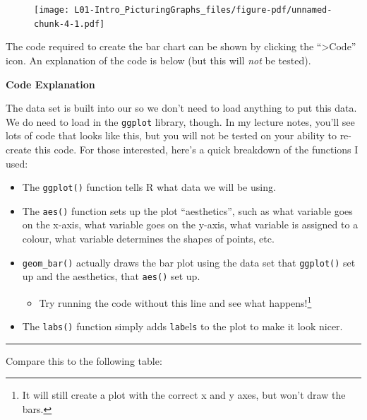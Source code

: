 \documentclass[
  letterpaper,
  DIV=11,
  numbers=noendperiod,
  oneside]{scrreprt}
\newenvironment{Shaded}{\begin{snugshade}}{\end{snugshade}}
\newcommand{\FunctionTok}[1]{\textcolor[rgb]{0.28,0.35,0.67}{#1}}
\newcommand{\NormalTok}[1]{\textcolor[rgb]{0.00,0.23,0.31}{#1}}
\newcommand{\SpecialCharTok}[1]{\textcolor[rgb]{0.37,0.37,0.37}{#1}}
\providecommand{\tightlist}{%
  \setlength{\itemsep}{0pt}\setlength{\parskip}{0pt}}\usepackage{longtable,booktabs,array}
\begin{document}
\begin{figure}[H]

{\centering \texttt{[image: L01-Intro\_PicturingGraphs\_files/figure-pdf/unnamed-chunk-4-1.pdf]}

}

\end{figure}

The code required to create the bar chart can be shown by clicking the
``\textgreater Code'' icon. An explanation of the code is below (but
this will \emph{not} be tested).

\textbf{Code Explanation}

The data set is built into our so we don't need to load anything to put
this data. We do need to load in the \texttt{ggplot} library, though. In
my lecture notes, you'll see lots of code that looks like this, but you
will not be tested on your ability to re-create this code. For those
interested, here's a quick breakdown of the functions I used:

\begin{itemize}
\tightlist
\item
  The \texttt{ggplot()} function tells R what data we will be using.
\item
  The \texttt{aes()} function sets up the plot ``aesthetics'', such as
  what variable goes on the x-axis, what variable goes on the y-axis,
  what variable is assigned to a colour, what variable determines the
  shapes of points, etc.
\item
  \texttt{geom\_bar()} actually draws the bar plot using the data set
  that \texttt{ggplot()} set up and the aesthetics, that \texttt{aes()}
  set up.

  \begin{itemize}
  \tightlist
  \item
    Try running the code without this line and see what
    happens!\footnote{It will still create a plot with the correct x and
      y axes, but won't draw the bars.}
  \end{itemize}
\item
  The \texttt{labs()} function simply adds \texttt{lab}el\texttt{s} to
  the plot to make it look nicer.
\end{itemize}

\begin{center}\rule{0.5\linewidth}{0.5pt}\end{center}

Compare this to the following table:

\begin{Shaded}
\end{Shaded}
\end{document}
